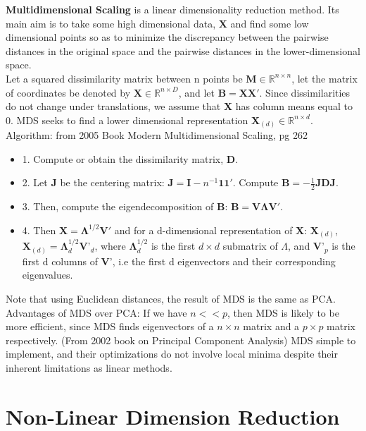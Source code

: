 \documentclass[12pt]{report}
\begin{document}
\textbf{Multidimensional Scaling} is a linear dimensionality reduction method. 
Its main aim is to take some high dimensional data, \textbf{X} 
and find some low dimensional points so as to minimize the discrepancy 
between the pairwise distances in the original space and the pairwise distances 
in the lower-dimensional space. \\
Let a squared dissimilarity matrix between n points be 
$\textbf{M} \in \mathbb{R}^{n \times n}$, 
let the matrix of coordinates be denoted by 
$\textbf{X} \in \mathbb{R}^{n \times D}$, 
and let $\textbf{B} = \textbf{X}\textbf{X}'$. 
Since dissimilarities do not change under translations, 
we assume that \textbf{X} has column means equal to 0. 
MDS seeks to find a lower dimensional representation 
$\textbf{X}_{(d)} \in \mathbb{R}^{n \times d}$.\\
Algorithm: from 2005 Book Modern Multidimensional Scaling, pg 262
\begin{itemize}
    \item 1. Compute or obtain the dissimilarity matrix, \textbf{D}.
    \item 2. Let \textbf{J} be the centering matrix: $\textbf{J} = \textbf{I} - n^{-1}\mathbf{1}\mathbf{1}'$. Compute $\textbf{B} = -\frac{1}{2}\textbf{J}\textbf{D}\textbf{J}$.
    \item 3. Then, compute the eigendecomposition of \textbf{B}: $\textbf{B} = \textbf{V}\mathbf{\Lambda}\textbf{V}'$. 
    \item 4. Then $\textbf{X} = \mathbf{\Lambda}^{1/2}\textbf{V}'$ 
    and for a d-dimensional representation of 
    \textbf{X}: $\textbf{X}_{(d)}$, $\textbf{X}_{(d)} = \mathbf{\Lambda}^{1/2}_d\textbf{V'}_d$, 
    where $\mathbf{\Lambda}^{1/2}_d$ is the first $d \times d$ submatrix of $\Lambda$,
     and $\textbf{V'}_p$ is the first d columns of \textbf{V}', 
     i.e the first d eigenvectors and their corresponding eigenvalues.
\end{itemize}
Note that using Euclidean distances, the result of MDS is the same as PCA.
Advantages of MDS over PCA: If we have $n << p$, then MDS is likely to be more efficient, 
since MDS finds eigenvectors of a $n \times n$ matrix and a $p \times p$ matrix respectively. 
(From 2002 book on Principal Component Analysis)
MDS simple to implement, and their optimizations 
do not involve local minima despite their inherent limitations as linear methods.

\section{Non-Linear Dimension Reduction}
\end{document}
